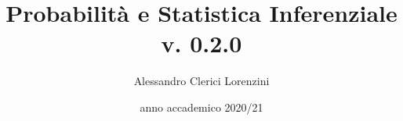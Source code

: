 \documentclass[a4paper]{article}
\begin{document}
\title{Probabilità e Statistica Inferenziale\\{\small v. 0.2.0}}
\author{Alessandro Clerici Lorenzini}
\date{anno accademico 2020/21}
\maketitle
\tableofcontents








\end{document}
